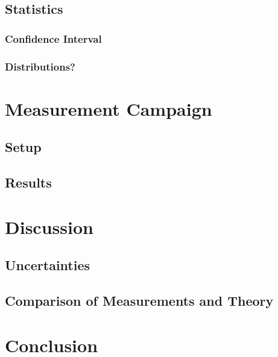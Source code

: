 \section{Statistics}
\subsection{Confidence Interval}
\subsection{Distributions?}

\chapter{Measurement Campaign}
\section{Setup}
\section{Results}

\chapter{Discussion}
\section{Uncertainties}
\section{Comparison of Measurements and Theory}

\chapter{Conclusion}




